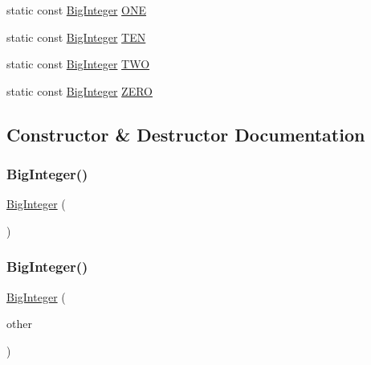 \begin{DoxyCompactItemize}
static const \mbox{\hyperlink{classBigInteger}{Big\+Integer}} \mbox{\hyperlink{classBigInteger_ab4699c19ec258ec72040ec18a7091282}{O\+NE}}
\item 
static const \mbox{\hyperlink{classBigInteger}{Big\+Integer}} \mbox{\hyperlink{classBigInteger_a4ba3620629ec7cd6672198f07ca23a39}{T\+EN}}
\item 
static const \mbox{\hyperlink{classBigInteger}{Big\+Integer}} \mbox{\hyperlink{classBigInteger_ac39750ccb95f4daaf9fc095f5cdac33d}{T\+WO}}
\item 
static const \mbox{\hyperlink{classBigInteger}{Big\+Integer}} \mbox{\hyperlink{classBigInteger_a9ffc8471ab0e5bfe12128dca249d965b}{Z\+E\+RO}}
\end{DoxyCompactItemize}


\subsection{Constructor \& Destructor Documentation}
\mbox{\label{classBigInteger_a49b951f4a6687820741740806aa04715}} 
\subsubsection{\texorpdfstring{Big\+Integer()}{BigInteger()}\hspace{0.1cm}{\footnotesize\ttfamily [1/4]}}
{\footnotesize\ttfamily \mbox{\hyperlink{classBigInteger}{Big\+Integer}} (\begin{DoxyParamCaption}{ }\end{DoxyParamCaption})}

\mbox{\label{classBigInteger_a2b2f122dc8513adcbf68d8b329834c9a}} 
\subsubsection{\texorpdfstring{Big\+Integer()}{BigInteger()}\hspace{0.1cm}{\footnotesize\ttfamily [2/4]}}
{\footnotesize\ttfamily \mbox{\hyperlink{classBigInteger}{Big\+Integer}} (\begin{DoxyParamCaption}\item[{const \mbox{\hyperlink{classBigInteger}{Big\+Integer}} \&}]{other }\end{DoxyParamCaption})}

